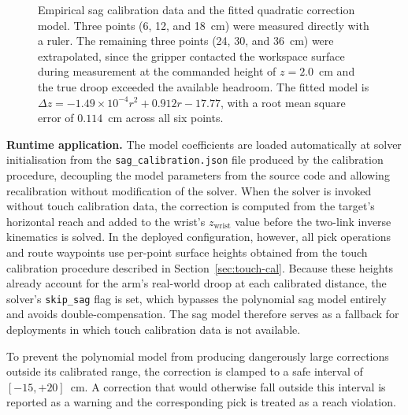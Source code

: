 \begin{figure}[H]
    \caption{Empirical sag calibration data and the fitted 
    quadratic correction model. Three points (6, 12, and 18~cm) 
    were measured directly with a ruler. The remaining three 
    points (24, 30, and 36~cm) were extrapolated, since the 
    gripper contacted the workspace surface during measurement at 
    the commanded height of $z = 2.0$~cm and the true droop 
    exceeded the available headroom. The fitted model is 
    $\Delta z = -1.49 \times 10^{-4} r^2 + 0.912 r - 17.77$, with 
    a root mean square error of $0.114$~cm across all six points.}
    \label{fig:sag_calibration}
\end{figure}

\textbf{Runtime application.} The model coefficients are loaded 
automatically at solver initialisation from the 
\texttt{sag\_calibration.json} file produced by the calibration 
procedure, decoupling the model parameters from the source code 
and allowing recalibration without modification of the solver. 
When the solver is invoked without touch calibration data, the 
correction is computed from the target's horizontal reach and 
added to the wrist's $z_{\mathrm{wrist}}$ value before the 
two-link inverse kinematics is solved. In the deployed 
configuration, however, all pick operations and route waypoints 
use per-point surface heights obtained from the touch 
calibration procedure described in Section~\ref{sec:touch-cal}. Because these 
heights already account for the arm's real-world droop at each 
calibrated distance, the solver's \texttt{skip\_sag} flag is 
set, which bypasses the polynomial sag model entirely and 
avoids double-compensation. The sag model therefore serves as 
a fallback for deployments in which touch calibration data is 
not available.

To prevent the polynomial model from producing dangerously 
large corrections outside its calibrated range, the correction 
is clamped to a safe interval of $[-15, +20]$~cm. A correction 
that would otherwise fall outside this interval is reported as a 
warning and the corresponding pick is treated as a reach 
violation.

